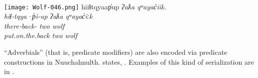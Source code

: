 \begin{exe}
  \ex\label{ex:3.16}
  \\
  \texttt{[image: Wolf-046.png]}
  \gllll hiiɬtqyaap̓up            \em{ʔaƛa} qʷayac̓iik.\\
         hiɬ‑tqya·p̓i‑up          \em{ʔaƛa} qʷayac̓iːk\\
         there‑back‑ \em{two}  wolf\\
         put.on.the.back         \em{two}  wolf\\
         \vfix
\end{exe}

\enquote{Adverbials} (that is, predicate modifiers) are also encoded via predicate constructions in Nuuchahnulth. \citeauthor{Nakayama2001} states, . Examples of this kind of serialization are in .

